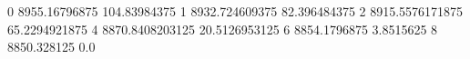 0 8955.16796875 104.83984375
1 8932.724609375 82.396484375
2 8915.5576171875 65.2294921875
4 8870.8408203125 20.5126953125
6 8854.1796875 3.8515625
8 8850.328125 0.0
